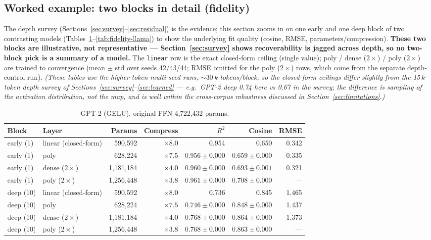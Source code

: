 \documentclass{article}
\begin{document}
\subsection{Worked example: two blocks in detail (fidelity)}
\label{sec:worked}

The depth survey (Sections~\ref{sec:survey}--\ref{sec:residual}) is the evidence; this section
zooms in on one early and one deep block of two contrasting models
(Tables~\ref{tab:fidelity-gpt2}--\ref{tab:fidelity-llama}) to show the underlying fit
quality (cosine, RMSE, parameters/compression). \textbf{These two blocks are illustrative, not
representative --- Section~\ref{sec:survey} shows recoverability is jagged across depth, so no
two-block pick is a summary of a model.} The \texttt{linear} row is the exact closed-form ceiling
(single value); poly / dense ($2\times$) / poly ($2\times$) are trained to convergence (mean
$\pm$ std over seeds 42/43/44; RMSE omitted for the poly ($2\times$) rows, which come from the
separate depth-control run). \emph{(These tables use the higher-token multi-seed runs,
${\sim}30$\,k tokens/block, so the closed-form ceilings differ slightly from the 15\,k-token
depth survey of Sections~\ref{sec:survey}--\ref{sec:learned} --- e.g.\ GPT-2 deep 0.74 here vs
0.67 in the survey; the difference is sampling of the activation distribution, not the map, and
is well within the cross-corpus robustness discussed in Section~\ref{sec:limitations}.)}

\begin{table}[t]
  \centering
  \small
  \setlength{\tabcolsep}{5pt}
  \caption{GPT-2 (GELU), original FFN 4{,}722{,}432 params.}
  \label{tab:fidelity-gpt2}
  \begin{tabular}{llrrrrr}
    \toprule
    Block & Layer & Params & Compress & $R^2$ & Cosine & RMSE \\
    \midrule
    early (1) & linear (closed-form) & 590{,}592   & $\times 8.0$ & 0.954 & 0.650 & 0.342 \\
    early (1) & poly                 & 628{,}224   & $\times 7.5$ & $0.956 \pm 0.000$ & $0.659 \pm 0.000$ & 0.335 \\
    early (1) & dense ($2\times$)    & 1{,}181{,}184 & $\times 4.0$ & $0.960 \pm 0.000$ & $0.693 \pm 0.001$ & 0.321 \\
    early (1) & poly ($2\times$)     & 1{,}256{,}448 & $\times 3.8$ & $0.961 \pm 0.000$ & $0.708 \pm 0.000$ & --- \\
    deep (10) & linear (closed-form) & 590{,}592   & $\times 8.0$ & 0.736 & 0.845 & 1.465 \\
    deep (10) & poly                 & 628{,}224   & $\times 7.5$ & $0.746 \pm 0.000$ & $0.848 \pm 0.000$ & 1.437 \\
    deep (10) & dense ($2\times$)    & 1{,}181{,}184 & $\times 4.0$ & $0.768 \pm 0.000$ & $0.864 \pm 0.000$ & 1.373 \\
    deep (10) & poly ($2\times$)     & 1{,}256{,}448 & $\times 3.8$ & $0.768 \pm 0.000$ & $0.863 \pm 0.000$ & --- \\
    \bottomrule
  \end{tabular}
\end{table}
\end{document}
